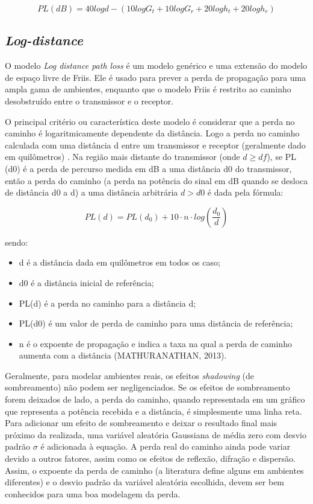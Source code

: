\documentclass[
	12pt,				%
	openright,			%
	twoside,			%
	a4paper,			%
	english,			%
	french,				%
	spanish,			%
	brazil				%
	]{abntex2}
\begin{document}
\begin{equation}
PL(dB) = 40 log d -(10 log G_{t} + 10 log G_{r} + 20 log h_{t} + 20 log h_{r})
\end{equation}

\subsection[Log-distance]{\textit{Log-distance}}

O modelo \textit{Log distance path loss} é um modelo genérico e uma extensão do modelo de espaço livre de Friis. Ele é usado para prever a perda de propagação para uma ampla gama de ambientes, enquanto que o modelo Friis é restrito ao caminho desobstruído entre o transmissor e o receptor.

O principal critério ou característica deste modelo é considerar que a perda no caminho é logaritmicamente dependente da distância. Logo a perda no caminho calculada com uma distância d entre um transmissor e receptor (geralmente dado em quilômetros) . Na região mais distante do transmissor (onde $d \geq df$), se PL (d0) é a perda de percurso medida em dB a uma distância d0 do transmissor, então a perda do caminho (a perda na potência do sinal em dB quando se desloca de distância d0 a d) a uma distância arbitrária $ d > d0 $ é dada pela fórmula:


\begin{equation}
PL(d) = PL(d_{0}) + 10 \cdot n \cdot log(\frac{d_{0}}{d})
\end{equation}

sendo:

\begin{itemize}
	\item d é a distância dada em quilômetros em todos os caso;
	\item d0 é a distância inicial de referência;
	\item PL(d) é a perda no caminho para a distância d;
	\item PL(d0) é um valor de perda de caminho para uma distância de referência;
	\item n é o expoente de propagação e indica a taxa na qual a perda de caminho aumenta com a distância (MATHURANATHAN, 2013).
\end{itemize}

Geralmente, para modelar ambientes reais, os efeitos \textit{shadowing} (de sombreamento) não podem ser negligenciados. Se os efeitos de sombreamento forem deixados de lado, a perda do caminho, quando representada em um gráfico que representa a potência recebida e a distância, é simplesmente uma linha reta. Para adicionar  um efeito de sombreamento e deixar o resultado final mais próximo da realizada, uma variável aleatória Gaussiana de média zero com desvio padrão $ \sigma $ é adicionada à equação. A perda real do caminho ainda pode variar devido a outros fatores, assim como os efeitos de reflexão, difração e dispersão. Assim, o expoente da perda de caminho (a literatura define alguns em ambientes diferentes) e o desvio padrão da variável aleatória escolhida, devem ser bem conhecidos para uma boa modelagem da perda.
\end{document}
